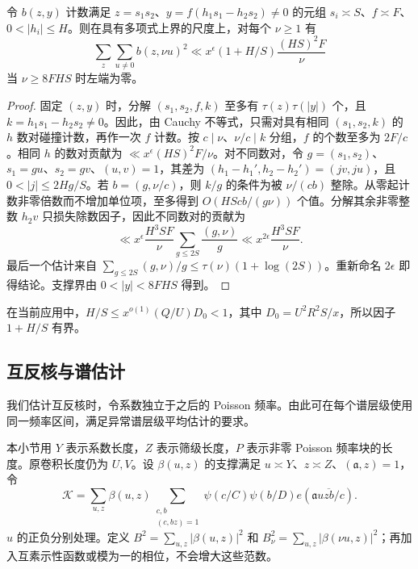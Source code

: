 \begin{lemma}\label{ana:multiplicity}
令 $b(z,y)$ 计数满足 $z=s_1s_2$、$y=f(h_1s_1-h_2s_2)\ne0$ 的元组 $s_i\asymp S$、$f\asymp F$、$0<|h_i|\le H$。则在具有多项式上界的尺度上，对每个 $\nu\ge1$ 有
\begin{equation}
 \sum_z\sum_{u\ne0}b(z,\nu u)^2
 \ll x^\epsilon(1+H/S)\frac{(HS)^2F}{\nu}
 \label{ana:multiplicity-bound}
\end{equation}
当 $\nu\ge8FHS$ 时左端为零。
\end{lemma}

\begin{proof}
固定 $(z,y)$ 时，分解 $(s_1,s_2,f,k)$ 至多有 $\tau(z)\tau(|y|)$ 个，且 $k=h_1s_1-h_2s_2\ne0$。因此，由 Cauchy 不等式，只需对具有相同 $(s_1,s_2,k)$ 的 $h$ 数对碰撞计数，再作一次 $f$ 计数。按 $c\mid\nu$、$\nu/c\mid k$ 分组，$f$ 的个数至多为 $2F/c$。相同 $h$ 的数对贡献为 $\ll x^\epsilon(HS)^2F/\nu$。对不同数对，令 $g=(s_1,s_2)$、$s_1=gu$、$s_2=gv$、$(u,v)=1$，其差为 $(h_1-h_1',h_2-h_2')=(jv,ju)$，且 $0<|j|\le2Hg/S$。若 $b=(g,\nu/c)$，则 $k/g$ 的条件为被 $\nu/(cb)$ 整除。从零起计数非零倍数而不增加单位项，至多得到 $O(HScb/(g\nu))$ 个值。分解其余非零整数 $h_2v$ 只损失除数因子，因此不同数对的贡献为
\[
 \ll x^\epsilon\frac{H^3SF}{\nu}
             \sum_{g\le2S}\frac{(g,\nu)}g
 \ll x^{2\epsilon}\frac{H^3SF}{\nu}.
\]
最后一个估计来自 $\sum_{g\le2S}(g,\nu)/g\le\tau(\nu)(1+\log(2S))$。重新命名 $2\epsilon$ 即得结论。支撑界由 $0<|y|<8FHS$ 得到。
\end{proof}

在当前应用中，$H/S\le x^{o(1)}(Q/U)D_0<1$，其中 $D_0=U^2R^2S/x$，所以因子 $1+H/S$ 有界。

\subsection{互反核与谱估计}

我们估计互反核时，令系数独立于之后的 Poisson 频率。由此可在每个谱层级使用同一频率区间，满足异常谱层级平均估计的要求。

本小节用 $Y$ 表示系数长度，$Z$ 表示筛级长度，$P$ 表示非零 Poisson 频率块的长度。原卷积长度仍为 $U,V$。设 $\beta(u,z)$ 的支撑满足 $u\asymp Y$、$z\asymp Z$、$(\mathfrak{a},z)=1$，令
\begin{equation}
 \mathcal K=\sum_{u,z}\beta(u,z)
   \sum_{\substack{c,b\\(c,bz)=1}}
   \psi(c/C)\psi(b/D)e(\mathfrak{a}u\overline{zb}/c).
 \label{ana:kernel}
\end{equation}
$u$ 的正负分别处理。定义 $B^2=\sum_{u,z}|\beta(u,z)|^2$ 和 $B_\nu^2=\sum_{u,z}|\beta(\nu u,z)|^2$；再加入互素示性函数或模为一的相位，不会增大这些范数。

